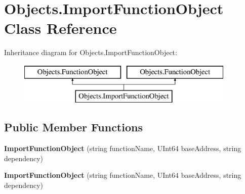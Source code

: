 \hypertarget{class_objects_1_1_import_function_object}{}\section{Objects.\+Import\+Function\+Object Class Reference}
\label{class_objects_1_1_import_function_object}
Inheritance diagram for Objects.\+Import\+Function\+Object\+:\begin{figure}[H]
\begin{center}
\leavevmode
\includegraphics[height=2.000000cm]{class_objects_1_1_import_function_object}
\end{center}
\end{figure}
\subsection*{Public Member Functions}
\begin{DoxyCompactItemize}
\item 
\mbox{\label{class_objects_1_1_import_function_object_aab954a59162122dab63b0396346b9de8}} 
{\bfseries Import\+Function\+Object} (string function\+Name, U\+Int64 base\+Address, string dependency)
\item 
\mbox{\label{class_objects_1_1_import_function_object_aab954a59162122dab63b0396346b9de8}} 
{\bfseries Import\+Function\+Object} (string function\+Name, U\+Int64 base\+Address, string dependency)
\end{DoxyCompactItemize}
